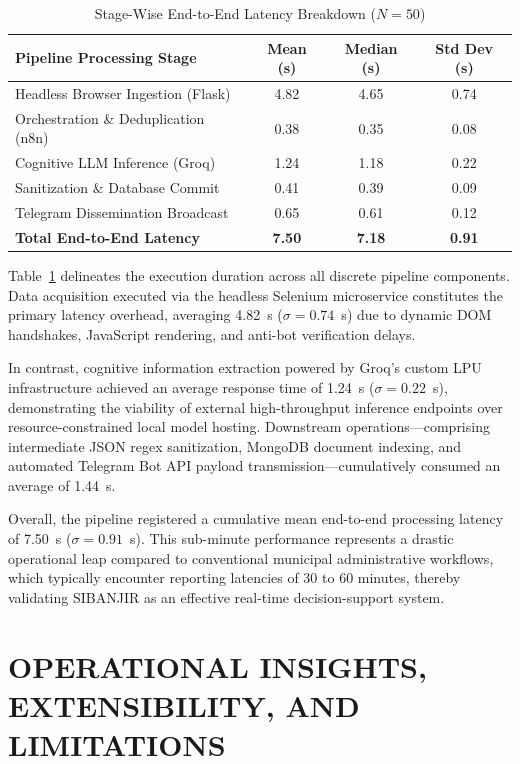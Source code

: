 \documentclass[conference]{IEEEtran}
\begin{document}
\begin{table}[htbp]
\caption{Stage-Wise End-to-End Latency Breakdown ($N=50$)}
\label{tab:latency_breakdown}
\centering
\small
\setlength{\tabcolsep}{2.5pt} 
\begin{tabularx}{\columnwidth}{>{\raggedright\arraybackslash}Xccc}
\toprule
\textbf{Pipeline Processing Stage} & \textbf{Mean (s)} & \textbf{Median (s)} & \textbf{Std Dev (s)} \\
\midrule
Headless Browser Ingestion (Flask)   & 4.82 & 4.65 & 0.74 \\
Orchestration \& Deduplication (n8n) & 0.38 & 0.35 & 0.08 \\
Cognitive LLM Inference (Groq)       & 1.24 & 1.18 & 0.22 \\
Sanitization \& Database Commit      & 0.41 & 0.39 & 0.09 \\
Telegram Dissemination Broadcast     & 0.65 & 0.61 & 0.12 \\
\midrule
\textbf{Total End-to-End Latency}    & \textbf{7.50} & \textbf{7.18} & \textbf{0.91} \\
\bottomrule
\end{tabularx}
\end{table}

Table~\ref{tab:latency_breakdown} delineates the execution duration across all discrete pipeline components. Data acquisition executed via the headless Selenium microservice constitutes the primary latency overhead, averaging 4.82~s ($\sigma = 0.74$~s) due to dynamic DOM handshakes, JavaScript rendering, and anti-bot verification delays. 

In contrast, cognitive information extraction powered by Groq's custom LPU infrastructure achieved an average response time of 1.24~s ($\sigma = 0.22$~s), demonstrating the viability of external high-throughput inference endpoints over resource-constrained local model hosting. Downstream operations—comprising intermediate JSON regex sanitization, MongoDB document indexing, and automated Telegram Bot API payload transmission—cumulatively consumed an average of 1.44~s. 

Overall, the pipeline registered a cumulative mean end-to-end processing latency of 7.50~s ($\sigma = 0.91$~s). This sub-minute performance represents a drastic operational leap compared to conventional municipal administrative workflows, which typically encounter reporting latencies of 30 to 60 minutes, thereby validating SIBANJIR as an effective real-time decision-support system.

\section{OPERATIONAL INSIGHTS, EXTENSIBILITY, AND LIMITATIONS}
\end{document}
